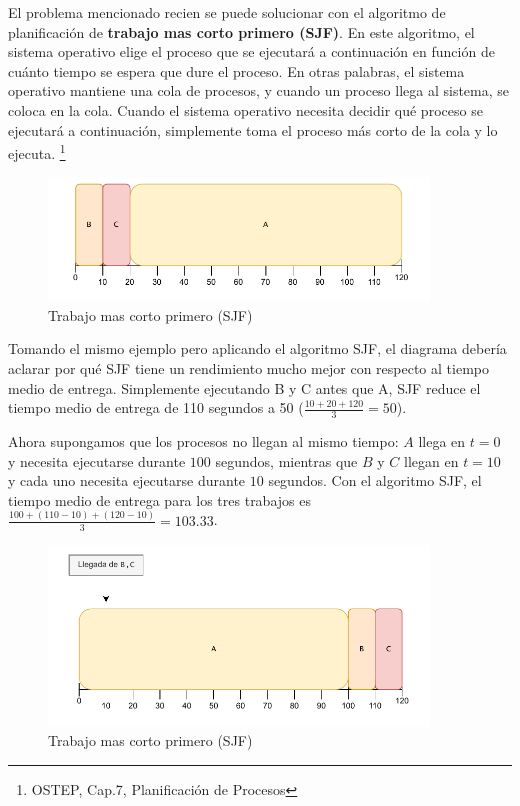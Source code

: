 \documentclass{article}
\begin{document}
El problema mencionado recien se puede solucionar con el algoritmo de planificación de \textbf{trabajo mas corto primero (SJF)}. En este algoritmo, el sistema operativo elige el proceso que se ejecutará a continuación en función de cuánto tiempo se espera que dure el proceso. En otras palabras, el sistema operativo mantiene una cola de procesos, y cuando un proceso llega al sistema, se coloca en la cola. Cuando el sistema operativo necesita decidir qué proceso se ejecutará a continuación, simplemente toma el proceso más corto de la cola y lo ejecuta. \footnote{OSTEP, Cap.7, Planificación de Procesos}

\begin{figure}[h]
    \centering
    \includegraphics[width=0.9\textwidth]{src/sjf.pdf}
    \caption{Trabajo mas corto primero (SJF)}
\end{figure}

Tomando el mismo ejemplo pero aplicando el algoritmo SJF, el diagrama debería aclarar por qué SJF tiene un rendimiento mucho mejor con respecto al tiempo medio de entrega. Simplemente ejecutando B y C antes que A, SJF reduce el tiempo medio de entrega de 110 segundos a 50 ($\frac{10+20+120}{3}=50$).

\newpage
Ahora supongamos que los procesos no llegan al mismo tiempo: $A$ llega en $t=0$ y necesita ejecutarse durante $100$ segundos, mientras que $B$ y $C$ llegan en $t=10$ y cada uno necesita ejecutarse durante $10$ segundos. Con el algoritmo SJF, el tiempo medio de entrega para los tres trabajos es $\frac{100+(110-10)+(120-10)}{3}=103.33$.
\begin{figure}[h]
    \centering
    \includegraphics[width=0.9\textwidth]{src/sjf1.pdf}
    \caption{Trabajo mas corto primero (SJF)}
\end{figure}
\end{document}
